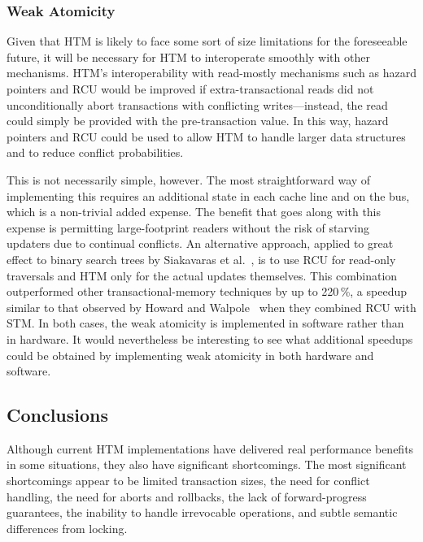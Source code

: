 \subsubsection{Weak Atomicity}
\label{sec:future:Weak Atomicity}

Given that HTM is likely to face some sort of size limitations for the
foreseeable future, it will be necessary for HTM to interoperate
smoothly with other mechanisms.
HTM's interoperability with read-mostly mechanisms such as hazard pointers
and RCU would be improved if extra-transactional reads did not
unconditionally abort transactions with conflicting writes---instead,
the read could simply be provided with the pre-transaction value.
In this way, hazard pointers and RCU could be used to allow HTM to handle
larger data structures and to reduce conflict probabilities.

This is not necessarily simple, however.
The most straightforward way of implementing this requires an additional
state in each cache line and on the bus, which is a non-trivial added
expense.
The benefit that goes along with this expense is permitting
large-footprint readers without the risk of starving updaters due
to continual conflicts.
An alternative approach, applied to great effect to binary search trees
by Siakavaras et al.~\cite{Siakavaras2017CombiningHA},
is to use RCU for read-only traversals and HTM
only for the actual updates themselves.
This combination outperformed other transactional-memory techniques by
up to 220\,\%, a speedup similar to that observed by
Howard and Walpole~\cite{PhilHoward2011RCUTMRBTree}
when they combined RCU with STM\@.
In both cases, the weak atomicity is implemented in software rather than
in hardware.
It would nevertheless be interesting to see what additional speedups
could be obtained by implementing weak atomicity in both hardware and
software.

\subsection{Conclusions}
\label{sec:future:Conclusions}

Although current HTM implementations have delivered real performance
benefits in some situations, they also have significant shortcomings.
The most significant shortcomings appear to be
limited transaction sizes,
the need for conflict handling, the need for aborts and rollbacks,
the lack of forward-progress guarantees,
the inability to handle irrevocable operations,
and subtle semantic differences
from locking.

